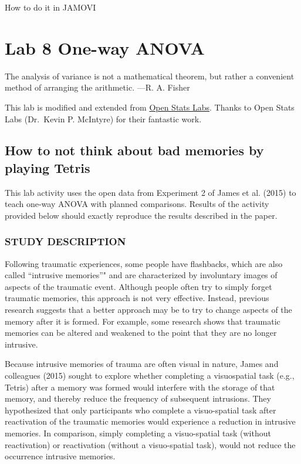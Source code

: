 \documentclass[]{book}
\begin{document}
How to do it in JAMOVI

\chapter{Lab 8 One-way ANOVA}\label{lab-8-one-way-anova}

{ The analysis of variance is not a mathematical theorem, but rather a
convenient method of arranging the arithmetic. ---R. A. Fisher }

This lab is modified and extended from
\href{https://sites.trinity.edu/osl}{Open Stats Labs}. Thanks to Open
Stats Labs (Dr.~Kevin P. McIntyre) for their fantastic work.

\section{How to not think about bad memories by playing
Tetris}\label{how-to-not-think-about-bad-memories-by-playing-tetris}

This lab activity uses the open data from Experiment 2 of James et al.
(2015) to teach one-way ANOVA with planned comparisons. Results of the
activity provided below should exactly reproduce the results described
in the paper.

\subsection{STUDY DESCRIPTION}\label{study-description-2}

Following traumatic experiences, some people have flashbacks, which are
also called ``intrusive memories''" and are characterized by involuntary
images of aspects of the traumatic event. Although people often try to
simply forget traumatic memories, this approach is not very effective.
Instead, previous research suggests that a better approach may be to try
to change aspects of the memory after it is formed. For example, some
research shows that traumatic memories can be altered and weakened to
the point that they are no longer intrusive.

Because intrusive memories of trauma are often visual in nature, James
and colleagues (2015) sought to explore whether completing a
visuospatial task (e.g., Tetris) after a memory was formed would
interfere with the storage of that memory, and thereby reduce the
frequency of subsequent intrusions. They hypothesized that only
participants who complete a visuo-spatial task after reactivation of the
traumatic memories would experience a reduction in intrusive memories.
In comparison, simply completing a visuo-spatial task (without
reactivation) or reactivation (without a visuo-spatial task), would not
reduce the occurrence intrusive memories.
\end{document}
